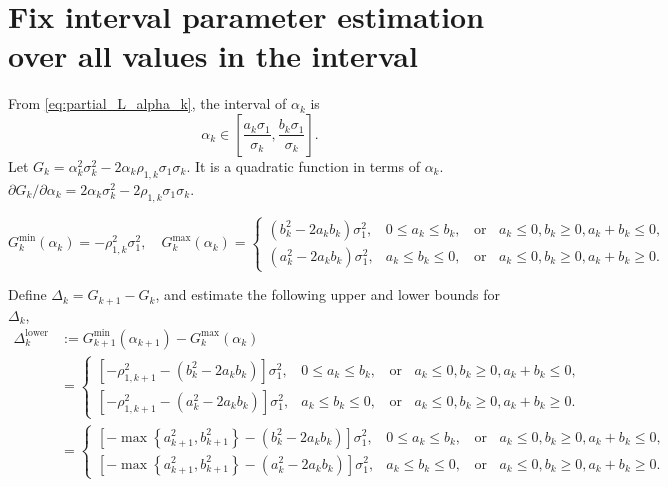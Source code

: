 \section{Fix interval parameter estimation over all values in the interval}
From \eqref{eq:partial_L_alpha_k}, the interval of $\alpha_k$ is 
\[
\alpha_k\in \left[\frac{a_k\sigma_1}{\sigma_k}, \frac{b_k\sigma_1}{\sigma_k}\right].
\]
Let $G_k =\alpha_k^2\sigma_k^2-2\alpha_k\rho_{1,k}\sigma_1\sigma_k$. It is a quadratic function in terms of $\alpha_k$. $\partial G_k/\partial \alpha_k = 2\alpha_k\sigma_k^2 - 2\rho_{1,k}\sigma_1\sigma_k$.


\[
G_k^{\text{min}}(\alpha_k) = -\rho_{1,k}^2\sigma_1^2,\quad
G_k^{\text{max}}(\alpha_k) =\left\{\begin{array}{ll}
\left(b_k^2-2a_kb_k\right)\sigma_1^2, & 0\le a_k\le b_k,\;\; \text{ or } \;\;a_k\le 0, b_k\ge 0, a_k+b_k\le 0,\\
\left(a_k^2-2a_kb_k\right)\sigma_1^2, &a_k\le b_k\le 0,\;\; \text{ or } \;\;a_k\le 0, b_k\ge 0, a_k+b_k\ge 0.
\end{array}
\right.
\]

Define $\Delta_k = G_{k+1} - G_k$, and estimate the following upper and lower bounds for $\Delta_k$,
\begin{align*}
\Delta_k^{\text{lower}}&:=G^{\text{min}}_{k+1}(\alpha_{k+1}) - G^{\text{max}}_{k}(\alpha_k)\\
&=\left\{\begin{array}{ll}
\left[-\rho_{1,k+1}^2-\left(b_k^2-2a_kb_k\right)\right]\sigma_1^2, & 0\le a_k\le b_k,\;\; \text{ or } \;\;a_k\le 0, b_k\ge 0, a_k+b_k\le 0,\\
\left[-\rho_{1,k+1}^2-\left(a_k^2-2a_kb_k\right)\right]\sigma_1^2, &a_k\le b_k\le 0,\;\; \text{ or } \;\;a_k\le 0, b_k\ge 0, a_k+b_k\ge 0.
\end{array}
\right.\\
&=\left\{\begin{array}{ll}
\left[-\max\left\{a_{k+1}^2,b_{k+1}^2\right\}-\left(b_k^2-2a_kb_k\right)\right]\sigma_1^2, & 0\le a_k\le b_k,\;\; \text{ or } \;\;a_k\le 0, b_k\ge 0, a_k+b_k\le 0,\\
\left[-\max\left\{a_{k+1}^2,b_{k+1}^2\right\}-\left(a_k^2-2a_kb_k\right)\right]\sigma_1^2, &a_k\le b_k\le 0,\;\; \text{ or } \;\;a_k\le 0, b_k\ge 0, a_k+b_k\ge 0.
\end{array}
\right.
\end{align*}



